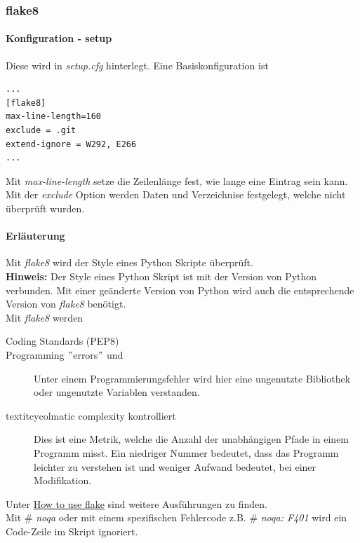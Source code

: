 \subsubsection{flake8}
\paragraph{Konfiguration - setup}
Diese wird in \textit{setup.cfg} hinterlegt. Eine Basiskonfiguration ist
\begin{lstlisting}[style=Config]
...
[flake8]
max-line-length=160
exclude = .git
extend-ignore = W292, E266
...
\end{lstlisting} 

Mit \textit{max-line-length} setze die Zeilenlänge fest, wie lange eine Eintrag sein kann. Mit der \textit{exclude} Option werden Daten und Verzeichnise festgelegt, welche nicht überprüft wurden.

\paragraph{Erläuterung}
Mit \textit{flake8} wird der Style eines Python Skripte überprüft.\\

\textbf{Hinweis:} Der Style eines Python Skript ist mit der Version von Python verbunden. Mit einer geänderte Version von Python wird auch die entsprechende Version von \textit{flake8} benötigt.\\

Mit \textit{flake8} werden
\begin{description}
	\item[Coding Standards (PEP8)]
	\item[Programming $"$errors$"$ und] Unter einem Programmierungsfehler wird hier eine ungenutzte Bibliothek oder ungenutzte Variablen verstanden.
	\item[textit{cycolmatic complexity} kontrolliert] Dies ist eine Metrik, welche die Anzahl der unabhängigen Pfade in einem Programm misst. Ein niedriger Nummer bedeutet, dass das Programm leichter zu verstehen ist und weniger Aufwand bedeutet, bei einer Modifikation.
\end{description}

Unter \href{https://simpleisbetterthancomplex.com/packages/2016/08/05/flake8.html}{How to use flake} sind weitere Ausführungen zu finden.\\

Mit $\#$ \textit{noqa} oder mit einem spezifischen Fehlercode z.B. $\#$ \textit{noqa: F401} wird ein Code-Zeile im Skript ignoriert.

